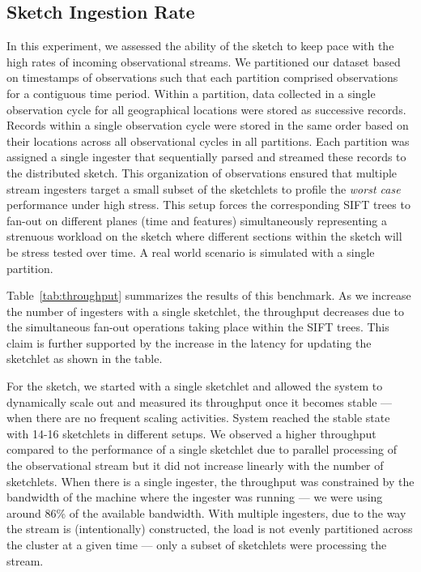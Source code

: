 \subsection{Sketch Ingestion Rate}
In this experiment, we assessed the ability of the sketch to keep pace with the high rates of incoming observational streams.
We partitioned our dataset based on timestamps of observations such that each partition comprised observations for a contiguous time period.
Within a partition, data collected in a single observation cycle for all geographical locations were stored as successive records.
Records within a single observation cycle were stored in the same order based on their locations across all observational cycles in all partitions.
Each partition was assigned a single ingester that sequentially parsed and streamed these records to the distributed sketch.
This organization of observations ensured that multiple stream ingesters target a small subset of the sketchlets to profile the \textit{worst case} performance under high stress.
This setup forces the corresponding SIFT trees to fan-out on different planes (time and features) simultaneously representing a strenuous workload on the sketch where different sections within the sketch will be stress tested over time.
A real world scenario is simulated with a single partition.

Table~\ref{tab:throughput} summarizes the results of this benchmark.
As we increase the number of ingesters with a single sketchlet, the throughput decreases due to the simultaneous fan-out operations taking place within the SIFT trees. This claim is further supported by the increase in the latency for updating the sketchlet as shown in the table.

For the sketch, we started with a single sketchlet and allowed the system to dynamically scale out and measured its throughput once it becomes stable --- when there are no frequent scaling activities.
System reached the stable state with 14-16 sketchlets in different setups.
We observed a higher throughput compared to the performance of a single sketchlet due to parallel processing of the observational stream but it did not increase linearly with the number of sketchlets.
When there is a single ingester, the throughput was constrained by the bandwidth of the machine where the ingester was running --- we were using around 86\% of the available bandwidth.
With multiple ingesters, due to the way the stream is (intentionally) constructed, the load is not evenly partitioned across the cluster at a given time --- only a subset of sketchlets were processing the stream.
%

